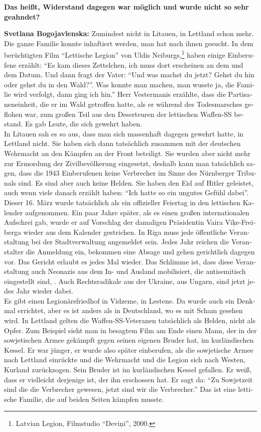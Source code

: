 \begin{otherlanguage}{ngerman}
\textbf{Das heißt, Widerstand dagegen war möglich und wurde nicht so sehr geahndet?}

\textbf{Svetlana Bogojavlenska:} Zumindest nicht in Litauen, in Lettland schon mehr. Die ganze Familie konnte inhaftiert werden, man hat nach ihnen gesucht. In dem berüchtigten Film "`Lettische Legion"' von Uldis Neiburgs,\footnote{Latvian Legion, Filmstudio "`Deviņi"', 2000.} haben einige Einberufene erzählt: "`Es kam dieses Zettelchen, ich muss dort erscheinen an dem und dem Datum. Und dann fragt der Vater: "`Und was machst du jetzt? Gehst du hin oder gehst du in den Wald?"'. Was konnte man machen, man wusste ja, die Familie wird verfolgt, dann ging ich hin."' Herr Vestermanis erzählte, dass die Partisaneneinheit, die er im Wald getroffen hatte, als er während des Todesmarsches geflohen war, zum großen Teil aus den Deserteuren der lettischen Waffen-SS bestand. Es gab Leute, die sich gewehrt haben.\\ 
In Litauen sah es so aus, dass man sich massenhaft dagegen gewehrt hatte, in Lettland nicht. Sie haben sich dann tatsächlich zusammen mit der deutschen Wehrmacht an den Kämpfen an der Front beteiligt. Sie wurden aber nicht mehr zur Ermordung der Zivilbevölkerung eingesetzt, deshalb kann man tatsächlich sagen, dass die 1943 Einberufenen keine Verbrecher im Sinne des Nürnberger Tribunals sind. Es sind aber auch keine Helden. Sie haben den Eid auf Hitler geleistet, auch wenn viele danach erzählt haben: "`Ich hatte so ein ungutes Gefühl dabei"'.\\ 
Dieser 16. März wurde tatsächlich als ein offizieller Feiertag in den lettischen Kalender aufgenommen. Ein paar Jahre später, als es einen großen internationalen Aufschrei gab, wurde er auf Vorschlag der damaligen Präsidentin Vaira Vīķe-Freiberga wieder aus dem Kalender gestrichen. In Riga muss jede öffentliche Veranstaltung bei der Stadtverwaltung angemeldet sein. Jedes Jahr reichen die Veranstalter die Anmeldung ein, bekommen eine Absage und gehen gerichtlich dagegen vor. Das Gericht erlaubt es jedes Mal wieder. Das Schlimme ist, dass diese Veranstaltung auch Neonazis aus dem In- und Ausland mobilisiert, die antisemitisch eingestellt sind, . Auch Rechtsradikale aus der Ukraine, aus Ungarn, sind jetzt jedes Jahr wieder dabei.\\
Es gibt einen Legionärsfriedhof in Vidzeme, in Lestene. Da wurde auch ein Denkmal errichtet, aber es ist anders als in Deutschland, wo es mit Scham gesehen wird. In Lettland gelten die Waffen-SS-Veteranen tatsächlich als Helden, nicht als Opfer. Zum Beispiel sieht man in besagtem Film am Ende einen Mann, der in der sowjetischen Armee gekämpft gegen seinen eigenen Bruder hat, im kurländischen Kessel. Er war jünger, er wurde also später einberufen, als die sowjetische Armee nach Lettland einrückte und die Wehrmacht und die Legion sich nach Westen, Kurland zurückzogen. Sein Bruder ist im kurländischen Kessel gefallen. Er weiß, dass er vielleicht derjenige ist, der ihn erschossen hat. Er sagt da: "`Zu Sowjetzeit sind die die Verbrecher gewesen, jetzt sind wir die Verbrecher."' Das ist eine lettische Familie, die auf beiden Seiten kämpfen musste.\\

\end{otherlanguage}
